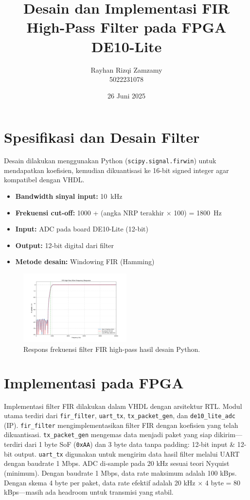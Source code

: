 \documentclass[a4paper,12pt]{article}
\title{Desain dan Implementasi FIR High-Pass Filter pada FPGA DE10-Lite}
\author{Rayhan Rizqi Zamzamy \\ 5022231078}
\date{26 Juni 2025}
\begin{document}
\maketitle

\section{Spesifikasi dan Desain Filter}

Desain dilakukan menggunakan Python (\texttt{scipy.signal.firwin}) untuk mendapatkan koefisien, 
kemudian dikuantisasi ke 16-bit signed integer agar kompatibel dengan VHDL.

\begin{itemize}
    \setlength\itemsep{0em}
    \item \textbf{Bandwidth sinyal input:} 10~kHz
    \item \textbf{Frekuensi cut-off:} 1000 + (angka NRP terakhir $\times$ 100) = 1800~Hz
    \item \textbf{Input:} ADC pada board DE10-Lite (12-bit)
    \item \textbf{Output:} 12-bit digital dari filter
    \item \textbf{Metode desain:} Windowing FIR (Hamming)
\end{itemize}

\vspace{-2em}
\begin{figure}[H]
    \centering
    \includegraphics[width=0.5\textwidth]{images/freq_response_sim.png}
    \caption{Respons frekuensi filter FIR high-pass hasil desain Python.}
\end{figure}
\vspace{-2em}

\section{Implementasi pada FPGA}

Implementasi filter FIR dilakukan dalam VHDL dengan arsitektur RTL. 
Modul utama terdiri dari \texttt{fir\_filter}, \texttt{uart\_tx}, \texttt{tx\_packet\_gen}, dan \texttt{de10\_lite\_adc} (IP). 
\texttt{fir\_filter} mengimplementasikan filter FIR dengan koefisien yang telah dikuantisasi. 
\texttt{tx\_packet\_gen} mengemas data menjadi paket yang siap dikirim---terdiri dari 1 byte SoF (\texttt{0xAA}) 
dan 3 byte data tanpa padding: 12-bit input \& 12-bit output.
\texttt{uart\_tx} digunakan untuk mengirim data hasil filter melalui UART dengan baudrate 1 Mbps.
ADC di-sample pada 20 kHz sesuai teori Nyquist (minimum). Dengan baudrate 1 Mbps, data rate maksimum adalah 100 kBps. 
Dengan skema 4 byte per paket, data rate efektif adalah 20 kHz $\times$ 4 byte = 80 kBps---masih ada headroom untuk transmisi yang stabil.
\end{document}
